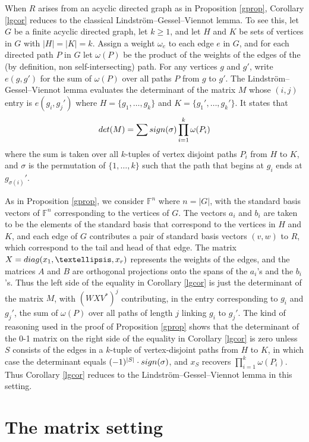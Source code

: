 \documentclass[10pt,a4paper]{amsart}
\begin{document}
When $R$ arises from an acyclic directed graph as in Proposition \ref{gprop}, Corollary \ref{lgcor} reduces to the classical Lindström–Gessel–Viennot lemma. To see this, let $G$ be a finite acyclic directed graph, let $k \geq 1$, and let $H$ and $K$ be sets of vertices in $G$ with $|H| = |K| = k$. Assign a weight $\omega_e$ to each edge $e$ in $G$, and for each directed path $P$ in $G$ let $\omega(P)$ be the product of the weights of the edges of the (by definition, non self-intersecting) path. For any vertices $g$ and $g'$, write $e(g, g')$ for the sum of $\omega(P)$ over all paths $P$ from $g$ to $g'$. The Lindström–Gessel–Viennot lemma evaluates the determinant of the matrix $M$ whose $(i,j)$ entry is $e(g_i, g_j')$ where $H = \{g_1, \ldots, g_k\}$ and $K = \{g_1', \ldots, g_k'\}$. It states that $${\rm det}(M) = \sum {\rm sign}(\sigma) \prod_{i=1}^k \omega(P_i)$$ where the sum is taken over all $k$-tuples of vertex disjoint paths $P_i$ from $H$ to $K$, and $\sigma$ is the permutation of $\{1, \ldots, k\}$ such that the path that begins at $g_i$ ends at $g_{\sigma(i)}'$.

As in Proposition \ref{gprop}, we consider $\mathbb{F}^n$ where $n = |G|$, with the standard basis vectors of $\mathbb{F}^n$ corresponding to the vertices of $G$. The vectors $a_i$ and $b_i$ are taken to be the elements of the standard basis that correspond to the vertices in $H$ and $K$, and each edge of $G$ contributes a pair of standard basis vectors $(v,w)$ to $R$, which correspond to the tail and head of that edge. The matrix $X = {\rm diag}(x_1, \ldots, x_r)$ represents the weights of the edges, and the matrices $A$ and $B$ are orthogonal projections onto the spans of the $a_i$'s and the $b_i$'s. Thus the left side of the equality in Corollary \ref{lgcor} is just the determinant of the matrix $M$, with $(WXV^*)^j$ contributing, in the entry corresponding to $g_i$ and $g_j'$, the sum of $\omega(P)$ over all paths of length $j$ linking $g_i$ to $g_j'$. The kind of reasoning used in the proof of Proposition \ref{gprop} shows that the determinant of the 0-1 matrix on the right side of the equality in Corollary \ref{lgcor} is zero unless $S$ consists of the edges in a $k$-tuple of vertex-disjoint paths from $H$ to $K$, in which case the determinant equals $(-1)^{|S|}\cdot {\rm sign}(\sigma)$, and $x_S$ recovers $\prod_{i=1}^k \omega(P_i)$. Thus Corollary \ref{lgcor} reduces to the Lindström–Gessel–Viennot lemma in this setting.

\section{The matrix setting}
\end{document}

